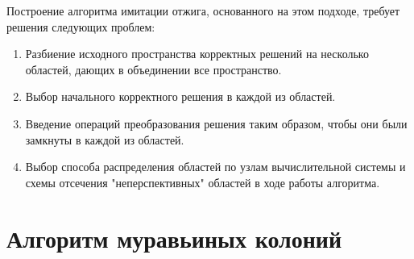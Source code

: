 \documentclass{article}
\begin{document}
Построение алгоритма имитации отжига, основанного на этом подходе, требует решения следующих проблем:
\begin{enumerate}
  \item Разбиение исходного пространства корректных решений на несколько областей, дающих в объединении все пространство.
  \item Выбор начального корректного решения  в каждой из областей.
  \item Введение операций преобразования решения таким образом, чтобы они были замкнуты в каждой из областей.
  \item Выбор способа распределения областей по узлам вычислительной системы и схемы отсечения "неперспективных" областей в ходе работы алгоритма.
\end{enumerate}
\newpage

\section{Алгоритм муравьиных колоний}
\end{document}
